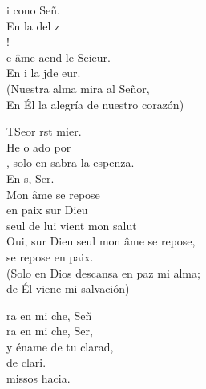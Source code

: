 \documentclass[12pt]{article}
\begin{document}
\begin{multicols*}{2}
\begin{cancion}%
	i cono Señ.  \\
	En  la del z\\
	!   \\
	e âme aend le Seieur.\\
	En i la jde eur.\\
(Nuestra alma mira al Señor,\\
En Él la alegría de nuestro corazón)\\
\end{cancion}%

\begin{cancion}%
	TSeor rst mier.\\
	He o ado por \\
	, solo en sabra la espenza. \\
	En s, Ser.\\
Mon âme se repose\\
en paix sur Dieu \\
seul de lui vient mon salut\\
Oui, sur Dieu seul mon âme se repose,\\
se repose en paix.\\
(Solo en Dios descansa en paz mi alma;\\
de Él viene mi salvación)\\
\end{cancion}%

\begin{cancion}%
	ra en mi che, Señ \\
	ra en mi che, Ser,\\
	y éname de tu clarad, \\
	de clari.\\
	missos hacia.\\
\end{cancion}%


\end{multicols*}
\end{document}
